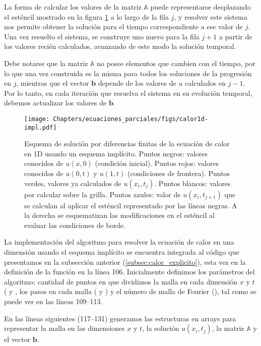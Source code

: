 La forma de calcular los valores de la matriz $\mathbb{A}$ puede representarse desplazando el esténcil mostrado en la figura \ref{fig:calor1dimpl} a lo largo de la fila $j$, y resolver este sistema nos permite obtener la solución para el tiempo correspondiente a ese valor de $j$. Una vez resuelto el sistema, se construye uno nuevo para la fila $j+1$ a partir de los valores recién calculados, avanzando de este modo la solución temporal.

Debe notarse que la matriz $\mathbb{A}$ no posee elementos que cambien con el tiempo, por lo que una vez construida es la misma para todos los soluciones de la progresión en $j$, mientras que el vector $\bm{b}$ depende de los valores de $u$ calculados en  $j-1$. Por lo tanto, en cada iteración que resuelva el sistema en su evolución temporal, debemos actualizar los valores de $\bm{b}$.

\begin{figure}[t]
 \centering
 \texttt{[image: Chapters/ecuaciones\_parciales/figs/calor1d-impl.pdf]}
 \caption{Esquema de solución por diferencias finitas de la ecuación de calor en 1D usando un esquema implícito. Puntos negros: valores conocidos de $u(x, 0)$ (condición inicial). Puntos rojos: valores conocidos de $u(0, t)$ y $u(1, t)$ (condiciones de frontera). Puntos verdes, valores ya calculados de $u(x_i, t_j)$. Puntos blancos: valores por calcular sobre la grilla. Puntos azules: valor de $u(x_i, t_{j+1})$ que se calculan al aplicar el esténcil representado por las líneas negras. A la derecha se esquematizan las modificaciones en el esténcil al evaluar las condiciones de borde.}
 \label{fig:calor1dimpl}
\end{figure}

La implementación del algoritmo para resolver la ecuación de calor en una dimensión usando el esquema implícito se encuentra integrada al código que presentamos en la subsección anterior (\ref{subsec:calor_explicito}), esta vez en la definición de la función  en la línea 106. Inicialmente definimos los parámetros del algoritmo: cantidad de puntos en que dividimos la malla en cada dimensión $x$ y $t$ ( y , los pasos en cada malla ( y ) y el número de malla de Fourier (), tal como se puede ver en las líneas 109--113.


En las líneas siguientes (117--131) generamos las estructuras en arrays para representar la malla en las dimensiones $x$ y $t$, la solución $u(x_i, t_j)$, la matriz $\mathbb{A}$ y el vector $\bm{b}$.

